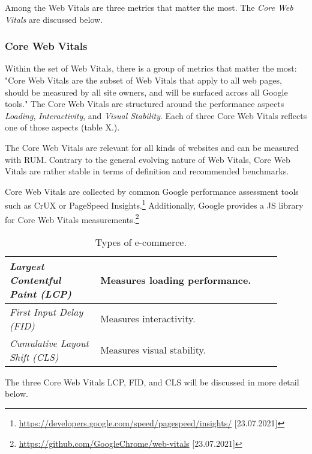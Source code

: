 
Among the Web Vitals are three metrics that matter the most.
The \textit{Core Web Vitals} are discussed below.





\subsubsection{Core Web Vitals}
\label{subsubsection:core_web_vitals}

Within the set of Web Vitals, there is a group of metrics that matter the most:
"Core Web Vitals are the subset of Web Vitals that apply to all web pages, should be measured by all site owners, and will be surfaced across all Google tools." %
The Core Web Vitals are structured around the performance aspects \textit{Loading}, \textit{Interactivity}, and \textit{Visual Stability}.
Each of three Core Web Vitals reflects one of those aspects (table X.).

The Core Web Vitals are relevant for all kinds of websites and can be measured with RUM.
Contrary to the general evolving nature of Web Vitals, Core Web Vitals are rather stable in terms of definition and recommended benchmarks.

Core Web Vitals are collected by common Google performance assessment tools such as CrUX or PageSpeed Insights.\footnote{\url{https://developers.google.com/speed/pagespeed/insights/} [23.07.2021]}
Additionally, Google provides a JS library for Core Web Vitals measurements.\footnote{\url{https://github.com/GoogleChrome/web-vitals} [23.07.2021]}

\begin{table}[h]
	\small
	\centering
	\begin{tabular}{  p{0.3\linewidth} | p{0.6\linewidth} }
	\textit{Largest Contentful Paint (LCP)} & Measures loading performance.  \\
	\hline
	\textit{First Input Delay (FID)} & Measures interactivity. \\
	\hline
	\textit{Cumulative Layout Shift (CLS)} & Measures visual stability.  \\
	\end{tabular}
	\medskip
	\caption{Types of e-commerce.}
	\label{table:types_ecommerce}
\end{table}

The three Core Web Vitals LCP, FID, and CLS will be discussed in more detail below.


